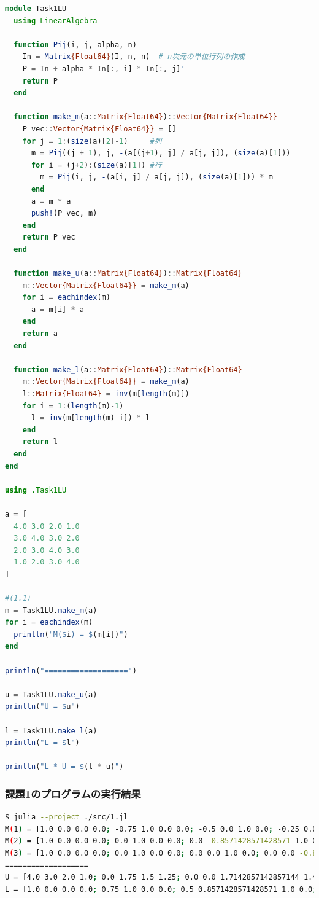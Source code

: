 \documentclass[uplatex, dvipdfmx, a4j,11pt]{jsarticle}
\begin{document}
\begin{lstlisting}[title={課題1の全体のプログラム}, label=code:in, language=Julia]
module Task1LU
  using LinearAlgebra
  
  function Pij(i, j, alpha, n)
    In = Matrix{Float64}(I, n, n)  # n次元の単位行列の作成
    P = In + alpha * In[:, i] * In[:, j]'
    return P
  end
  
  function make_m(a::Matrix{Float64})::Vector{Matrix{Float64}}
    P_vec::Vector{Matrix{Float64}} = []
    for j = 1:(size(a)[2]-1)     #列
      m = Pij((j + 1), j, -(a[(j+1), j] / a[j, j]), (size(a)[1]))
      for i = (j+2):(size(a)[1]) #行
        m = Pij(i, j, -(a[i, j] / a[j, j]), (size(a)[1])) * m
      end
      a = m * a
      push!(P_vec, m)
    end
    return P_vec
  end
  
  function make_u(a::Matrix{Float64})::Matrix{Float64}
    m::Vector{Matrix{Float64}} = make_m(a)
    for i = eachindex(m)
      a = m[i] * a
    end
    return a
  end
  
  function make_l(a::Matrix{Float64})::Matrix{Float64}
    m::Vector{Matrix{Float64}} = make_m(a)
    l::Matrix{Float64} = inv(m[length(m)])
    for i = 1:(length(m)-1)
      l = inv(m[length(m)-i]) * l
    end
    return l
  end
end

using .Task1LU

a = [
  4.0 3.0 2.0 1.0
  3.0 4.0 3.0 2.0
  2.0 3.0 4.0 3.0
  1.0 2.0 3.0 4.0
]

#(1.1)
m = Task1LU.make_m(a)
for i = eachindex(m)
  println("M($i) = $(m[i])")
end

println("===================")

u = Task1LU.make_u(a)
println("U = $u")

l = Task1LU.make_l(a)
println("L = $l")

println("L * U = $(l * u)")
\end{lstlisting}

\subsubsection*{課題1のプログラムの実行結果}
\begin{lstlisting}[title={課題1のプログラムの実行結果}, label=code:in, language=sh]
$ julia --project ./src/1.jl
M(1) = [1.0 0.0 0.0 0.0; -0.75 1.0 0.0 0.0; -0.5 0.0 1.0 0.0; -0.25 0.0 0.0 1.0]
M(2) = [1.0 0.0 0.0 0.0; 0.0 1.0 0.0 0.0; 0.0 -0.8571428571428571 1.0 0.0; 0.0 -0.7142857142857143 0.0 1.0]
M(3) = [1.0 0.0 0.0 0.0; 0.0 1.0 0.0 0.0; 0.0 0.0 1.0 0.0; 0.0 0.0 -0.8333333333333333 1.0]
===================
U = [4.0 3.0 2.0 1.0; 0.0 1.75 1.5 1.25; 0.0 0.0 1.7142857142857144 1.4285714285714286; 0.0 0.0 0.0 1.6666666666666667]
L = [1.0 0.0 0.0 0.0; 0.75 1.0 0.0 0.0; 0.5 0.8571428571428571 1.0 0.0; 0.25 0.7142857142857143 0.8333333333333333 1.0]
\end{lstlisting}
\end{document}
